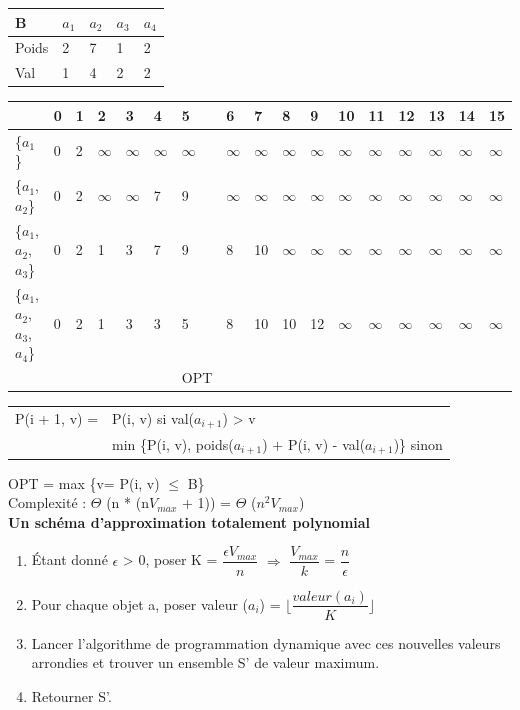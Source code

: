 \documentclass[12pt,a4paper]{article}
\begin{document}
\begin{center}
	\begin{tabular} {l|llll}
		B	& $a_1$ & $a_2$ & $a_3$ & $a_4$\\\hline
		Poids& 2 & 7 & 1 & 2\\\hline
		Val & 1 & 4 & 2 & 2
	\end{tabular}
	\begin{tabular} {l|llllllllllllllll}
		& 0 & 1 & 2 & 3 & 4 & 5 & 6 & 7 & 8 & 9 & 10 & 11 & 12 & 13 & 14 & 15\\\hline
		\{$a_1$\} & 0 & 2 & $\infty$ & $\infty$ & $\infty$ & $\infty$ & $\infty$ & $\infty$ & $\infty$ & $\infty$ & $\infty$ & $\infty$ & $\infty$ & $\infty$ & $\infty$ & $\infty$\\\hline
		\{$a_1$, $a_2$\} & 0 & 2 & $\infty$ & $\infty$ & 7 & 9 & $\infty$ & $\infty$ & $\infty$ & $\infty$ & $\infty$ & $\infty$ & $\infty$ & $\infty$ & $\infty$ & $\infty$\\\hline
		\{$a_1$, $a_2$, $a_3$\} & 0 & 2 & 1 & 3 & 7 & 9 & 8 & 10 & $\infty$ & $\infty$ & $\infty$ & $\infty$ & $\infty$ & $\infty$ & $\infty$ & $\infty$ \\\hline
		\{$a_1$, $a_2$, $a_3$, $a_4$\} & 0 & 2 & 1 & 3 & 3 & {\color{red} 5} & 8 & 10 & 10 & 12 & $\infty$ & $\infty$ & $\infty$ & $\infty$ & $\infty$ & $\infty$\\
		& & & & & & {\color{red} OPT}
	\end{tabular}
\end{center}
\begin{tabular} {ll}
	P(i + 1, v) = & P(i, v) si val($a_{i + 1}$) > v\\
	& min \{P(i, v), poids($a_{i + 1}$) + P(i, v) - val($a_{i + 1}$)\} sinon
\end{tabular}
\newline
OPT = max \{v= P(i, v) $\leq$ B\}\\
{\color{red} Complexité : $\Theta$ (n * (n$V_{max}$ + 1)) = $\Theta$ ($n^2$$V_{max}$)}\\
\textbf{Un schéma d'approximation totalement polynomial}\\
\begin{enumerate}
	\item Étant donné $\epsilon$ > 0, poser K = $\dfrac{\epsilon V_{max}}{n}$ $\Rightarrow$ $\dfrac{V_{max}}{k}$ = $\dfrac{n}{\epsilon}$
	\item Pour chaque objet a, poser valeur ($a_i$) = $\lfloor \dfrac{valeur(a_i)}{K} \rfloor$
	\item Lancer l'algorithme de programmation dynamique avec ces nouvelles valeurs arrondies et trouver un ensemble S' de valeur maximum.
	\item Retourner S'.
\end{enumerate}
\end{document}
